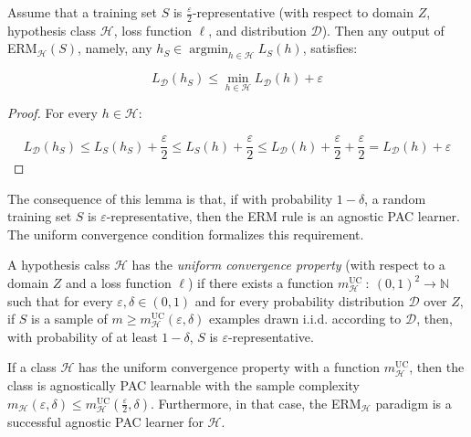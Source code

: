 \documentclass[../../main/main.tex]{subfiles}
\begin{document}
\begin{lemma}[]
	Assume that a training set \( S \) is \( \frac{\varepsilon}{2} \)-representative (with respect to domain \( Z \), hypothesis class \( \mathcal{H} \), loss function \( \ell \), and distribution \( \mathcal{D} \)).
	Then any output of ERM$_{\mathcal{H}}(S)$, namely, any \( h_S \in \operatorname{argmin}_{h \in \mathcal{H}} L_S(h) \), satisfies:

	\begin{equation}
	    L_{\mathcal{D}}(h_S)
		\le
		\underset{h \in \mathcal{H}}{\min{}} L_{\mathcal{D}}(h) + \varepsilon
	    \label{eq:C3_HERL}
	\end{equation}
\end{lemma}

\begin{proof}
	For every \( h \in \mathcal{H} \):

	\[
	    L_{\mathcal{D}}(h_S)
		\le
		L_S(h_S) + \frac{\varepsilon}{2}
		\le
		L_S(h) + \frac{\varepsilon}{2}
		\le
		L_{\mathcal{D}}(h) + \frac{\varepsilon}{2} + \frac{\varepsilon}{2}
		=
		L_{\mathcal{D}}(h) + \varepsilon
	\]
\end{proof}

The consequence of this lemma is that, if with probability \( 1 - \delta \), a random training set \( S \) is \( \varepsilon \)-representative, then the ERM rule is an agnostic PAC learner. The uniform convergence condition formalizes this requirement.

\begin{definition}
	A hypothesis calss \( \mathcal{H} \) has the \emph{uniform convergence property} (with respect to a domain \( Z \) and a loss function \( \ell \))
	if there exists a function \( m_{\mathcal{H}}^{\text{UC}} \ : \ (0,1)^2 \to \mathbb{N} \) such that for every \( \varepsilon, \delta \in (0,1) \)
	and for every probability distribution \( \mathcal{D} \) over \( Z \), if \( S \) is a sample of \( m \ge m_{\mathcal{H}}^{\text{UC}}(\varepsilon,\delta ) \) examples drawn i.i.d. according to \( \mathcal{D} \),
	then, with probability of at least \( 1 - \delta \), \( S \) is \( \varepsilon \)-representative.
\end{definition}

\begin{corollary}[]
	If a class \( \mathcal{H} \) has the uniform convergence property with a function \( m_{\mathcal{H}}^{\text{UC}} \),
    then the class is agnostically PAC learnable with the sample complexity \( m_{\mathcal{H}}(\varepsilon, \delta) \le m_{\mathcal{H}}^{\text{UC}}(\frac{\varepsilon}{2},\delta) \).
    Furthermore, in that case, the ERM$_{\mathcal{H}}$ paradigm is a successful agnostic PAC learner for \( \mathcal{H} \).
\end{corollary}
\end{document}
